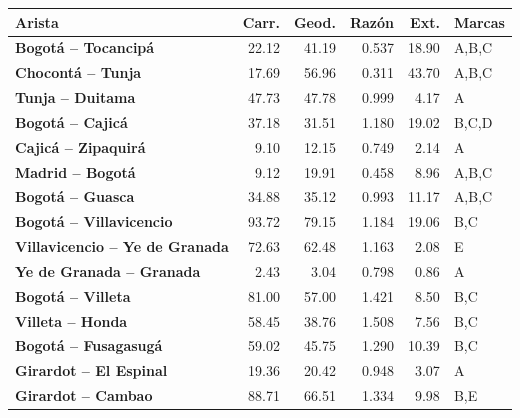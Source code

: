 \renewcommand{\arraystretch}{1.2}
\begin{tabular}{|l|r|r|r|r|l|}
\hline
\rowcolor{gray!20} \textbf{Arista} & \textbf{Carr.} & \textbf{Geod.} & \textbf{Razón} & \textbf{Ext.} & \textbf{Marcas} \\
\hline
\textbf{Bogotá -- Tocancipá} & 22.12 & 41.19 & 0.537 & 18.90 & A,B,C \\
\hline
\textbf{Chocontá -- Tunja} & 17.69 & 56.96 & 0.311 & 43.70 & A,B,C \\
\hline
\textbf{Tunja -- Duitama} & 47.73 & 47.78 & 0.999 & 4.17 & A \\
\hline
\textbf{Bogotá -- Cajicá} & 37.18 & 31.51 & 1.180 & 19.02 & B,C,D \\
\hline
\textbf{Cajicá -- Zipaquirá} & 9.10 & 12.15 & 0.749 & 2.14 & A \\
\hline
\textbf{Madrid -- Bogotá} & 9.12 & 19.91 & 0.458 & 8.96 & A,B,C \\
\hline
\textbf{Bogotá -- Guasca} & 34.88 & 35.12 & 0.993 & 11.17 & A,B,C \\
\hline
\textbf{Bogotá -- Villavicencio} & 93.72 & 79.15 & 1.184 & 19.06 & B,C \\
\hline
\textbf{Villavicencio -- Ye de Granada} & 72.63 & 62.48 & 1.163 & 2.08 & E \\
\hline
\textbf{Ye de Granada -- Granada} & 2.43 & 3.04 & 0.798 & 0.86 & A \\
\hline
\textbf{Bogotá -- Villeta} & 81.00 & 57.00 & 1.421 & 8.50 & B,C \\
\hline
\textbf{Villeta -- Honda} & 58.45 & 38.76 & 1.508 & 7.56 & B,C \\
\hline
\textbf{Bogotá -- Fusagasugá} & 59.02 & 45.75 & 1.290 & 10.39 & B,C \\
\hline
\textbf{Girardot -- El Espinal} & 19.36 & 20.42 & 0.948 & 3.07 & A \\
\hline
\textbf{Girardot -- Cambao} & 88.71 & 66.51 & 1.334 & 9.98 & B,E \\
\hline
\end{tabular}
